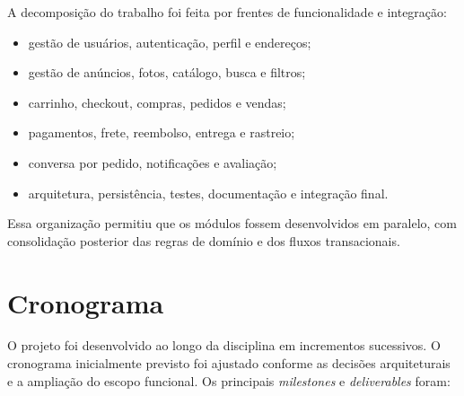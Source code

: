﻿\documentclass[12pt,a4paper]{article}
\begin{document}
A decomposição do trabalho foi feita por frentes de funcionalidade e integração:

\begin{itemize}
    \item gestão de usuários, autenticação, perfil e endereços;
    \item gestão de anúncios, fotos, catálogo, busca e filtros;
    \item carrinho, checkout, compras, pedidos e vendas;
    \item pagamentos, frete, reembolso, entrega e rastreio;
    \item conversa por pedido, notificações e avaliação;
    \item arquitetura, persistência, testes, documentação e integração final.
\end{itemize}

Essa organização permitiu que os módulos fossem desenvolvidos em paralelo, com consolidação posterior das regras de domínio e dos fluxos transacionais.

\section{Cronograma}
O projeto foi desenvolvido ao longo da disciplina em incrementos sucessivos. O cronograma inicialmente previsto foi ajustado conforme as decisões arquiteturais e a ampliação do escopo funcional. Os principais \textit{milestones} e \textit{deliverables} foram:
\end{document}
